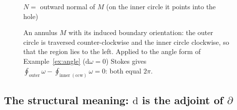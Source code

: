 \documentclass[11pt,a4paper]{article}
\numberwithin{equation}{section}
\theoremstyle{definition}
\theoremstyle{plain}
\newcommand{\dd}{\mathrm{d}}
\begin{document}
\begin{figure}[ht]
\centering
{}

\small $N=$ outward normal of $M$ (on the inner circle it points into the hole)
\caption{An annulus $M$ with its induced boundary orientation: the outer circle is traversed counter-clockwise and the inner circle clockwise, so that the region lies to the left. Applied to the angle form of Example~\ref{ex:angle} ($\dd\omega=0$) Stokes gives $\oint_{\mathrm{outer}}\omega-\oint_{\mathrm{inner\ (ccw)}}\omega=0$: both equal $2\pi$.}
\label{fig:annulus}
\end{figure}

\subsection{The structural meaning: $\dd$ is the adjoint of $\partial$}\label{sec:adjoint}
\end{document}
